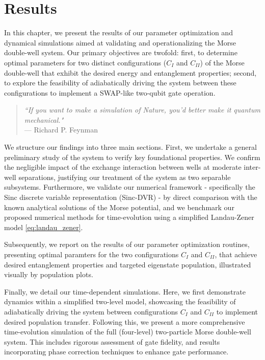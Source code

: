 \documentclass{subfiles}
\begin{document}
\chapter{Results}
In this chapter, we present the results of our parameter optimization and dynamical simulations aimed at validating and operationalizing the Morse double-well system. Our primary objectives are twofold: first, to determine optimal parameters for two distinct configurations ($C_I$ and $C_{II}$) of the Morse double-well that exhibit the desired energy and entanglement properties; second, to explore the feasibility of adiabatically driving the system between these configurations to implement a SWAP-like two-qubit gate operation.

\begin{quote}
    \centering
    \textit{“If you want to make a simulation of Nature, you'd better make it quantum mechanical."}\\
    \vspace{0.2cm}
    --- Richard P. Feynman    
\end{quote}



We structure our findings into three main sections. First, we undertake a general preliminary study of the system to verify key foundational properties. We confirm the negligible impact of the exchange interaction between wells at moderate inter-well separations, justifying our treatment of the system as two separable subsystems. Furthermore, we validate our numerical framework - specifically the Sinc discrete variable representation (Sinc-DVR) - by direct comparison with the known analytical solutions of the Morse potential, and we benchmark our proposed numerical methods for time-evolution using a simplified Landau-Zener model \eqref{eq:landau_zener}.

Subsequently, we report on the results of our parameter optimization routines, presenting optimal paramters for the two configurations $C_I$ and $C_{II}$, that achieve desired entanglement properties and targeted eigenstate population, illustrated visually by population plots.

Finally, we detail our time-dependent simulations. Here, we first demonstrate dynamics within a simplified two-level model, showcasing the feasibility of adiabatically driving the system between configurations $C_I$ and $C_{II}$ to implement desired population transfer. Following this, we present a more comprehensive time-evolution simulation of the full (four-level) two-particle Morse double-well system. This includes rigorous assessment of gate fidelity, and results incorporating phase correction techniques to enhance gate performance.

\newpage



\end{document}
